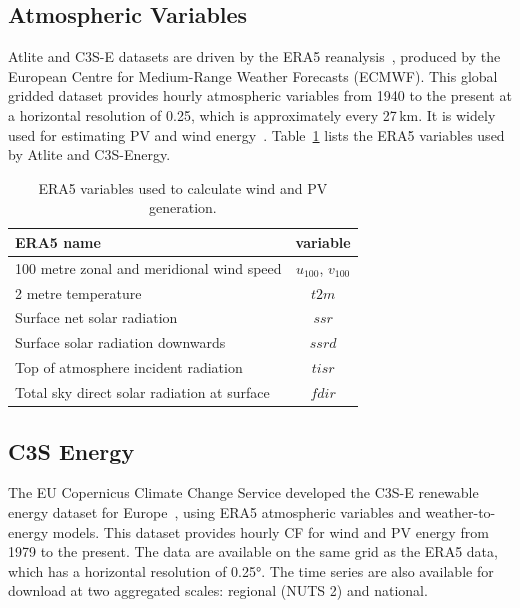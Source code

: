 \documentclass[a4paper, 11p1t]{article}
\begin{document}
\subsection{Atmospheric Variables}
\label{sec:era5}
 
Atlite and C3S-E datasets are driven by the ERA5 reanalysis~\cite{hersbach2020era5}, produced by the European Centre for Medium-Range Weather Forecasts (ECMWF). This global gridded dataset provides hourly atmospheric variables from 1940 to the present at a horizontal resolution of 0.25\textdegree, which is approximately every 27\,km. It is widely used for estimating PV and wind energy~\cite{mockert2023drought, dubus2023energy, brown2021drought, otero2022drought}. Table~\ref{tab:var_name} lists the ERA5 variables used by Atlite and C3S-Energy.

\begin{table}[h!]
	\centering
	\begin{tabular}{|l|c|}
		\hline
		{\textbf{ERA5 name}}      & \textbf{variable} \\ \hline
		100 metre zonal and meridional wind speed   & $u_{100}$, $v_{100}$ \\
		2 metre temperature                         & $t2m$ \\
		Surface net solar radiation                 & $ssr$ \\
		Surface solar radiation downwards           & $ssrd$  \\
		Top of atmosphere incident radiation        & $tisr$  \\
		Total sky direct solar radiation at surface & $fdir$  \\ \hline
	\end{tabular}
	\caption{ERA5 variables used to calculate wind and PV generation.}
	\label{tab:var_name}
\end{table}

\subsection{C3S Energy}
\label{sec:c3se}

The EU Copernicus Climate Change Service developed the C3S-E renewable energy dataset for Europe~\cite{dubus2023energy}, using ERA5 atmospheric variables and weather-to-energy models. This dataset provides hourly CF for wind and PV energy from 1979 to the present. The data are available on the same grid as the ERA5 data, which has a horizontal resolution of 0.25°. The time series are also available for download at two aggregated scales: regional (NUTS 2) and national.
\end{document}
